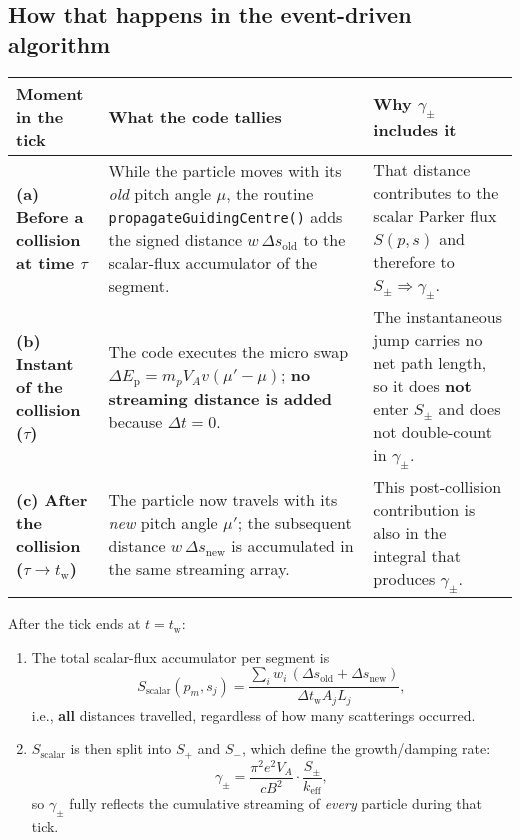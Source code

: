 {\subsection*{How that happens in the event-driven algorithm}

\begin{table}[h!]
\centering
\renewcommand{\arraystretch}{1.4}
\begin{tabular}{|p{4.2cm}|p{7.5cm}|p{5.5cm}|}
\hline
\textbf{Moment in the tick} & \textbf{What the code tallies} & \textbf{Why $\gamma_\pm$ includes it} \\
\hline

\textbf{(a) Before a collision at time $\tau$} &
While the particle moves with its \emph{old} pitch angle $\mu$, the routine \texttt{propagateGuidingCentre()} adds the signed distance $w\,\Delta s_{\mathrm{old}}$ to the scalar-flux accumulator of the segment. &
That distance contributes to the scalar Parker flux $S(p,s)$ and therefore to $S_\pm \Rightarrow \gamma_\pm$. \\
\hline

\textbf{(b) Instant of the collision ($\tau$)} &
The code executes the micro swap $\Delta E_{\mathrm p} = m_p V_A v (\mu' - \mu)$; \textbf{no streaming distance is added} because $\Delta t = 0$. &
The instantaneous jump carries no net path length, so it does \textbf{not} enter $S_\pm$ and does not double-count in $\gamma_\pm$. \\
\hline

\textbf{(c) After the collision ($\tau \rightarrow t_{\mathrm w}$)} &
The particle now travels with its \emph{new} pitch angle $\mu'$; the subsequent distance $w\,\Delta s_{\mathrm{new}}$ is accumulated in the same streaming array. &
This post-collision contribution is also in the integral that produces $\gamma_\pm$. \\
\hline
\end{tabular}
\end{table}

\noindent After the tick ends at $t = t_{\mathrm w}$:

\begin{enumerate}
  \item The total scalar-flux accumulator per segment is
  \[
  S_{\mathrm{scalar}}(p_m, s_j)
  = \frac{\sum_i w_i\,\left(\Delta s_{\mathrm{old}} + \Delta s_{\mathrm{new}}\right)}
         {\Delta t_{\mathrm w} A_j L_j},
  \]
  i.e., \textbf{all} distances travelled, regardless of how many scatterings occurred.

  \item $S_{\mathrm{scalar}}$ is then split into $S_+$ and $S_-$, which define the growth/damping rate:
  \[
  \gamma_\pm = \frac{\pi^2 e^2 V_A}{c B^2} \cdot \frac{S_\pm}{k_{\mathrm{eff}}},
  \]
  so $\gamma_\pm$ fully reflects the cumulative streaming of \emph{every} particle during that tick.
\end{enumerate}

}
